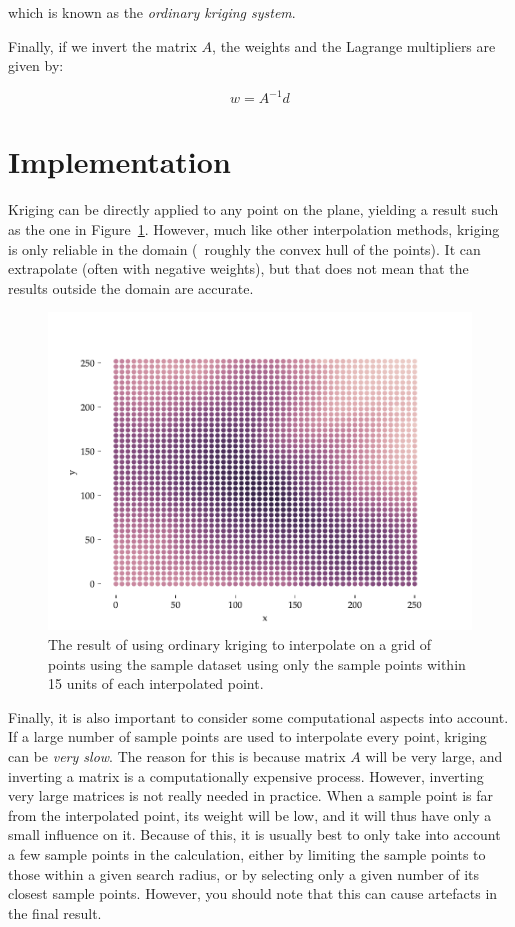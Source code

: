 which is known as the \emph{ordinary kriging system}.

Finally, if we invert the matrix \(A\), the weights and the Lagrange multipliers are given by:

\begin{equation}
w = A^{-1}d
\end{equation}

%
\section{Implementation}

Kriging can be directly applied to any point on the plane, yielding a result such as the one in Figure~\ref{fig:interpolation}.
However, much like other interpolation methods, kriging is only reliable in the domain (\ie\ roughly the convex hull of the points).
It can extrapolate (often with negative weights), but that does not mean that the results outside the domain are accurate.

\begin{figure}[htbp]
\centering
\includegraphics[width=\linewidth]{figs/interpolation}
\caption{The result of using ordinary kriging to interpolate on a grid of points using the sample dataset using only the sample points within 15 units of each interpolated point.}%
\label{fig:interpolation}
\end{figure}

Finally, it is also important to consider some computational aspects into account.
If a large number of sample points are used to interpolate every point, kriging can be \emph{very slow}.
The reason for this is because matrix \(A\) will be very large, and inverting a matrix is a computationally expensive process.
However, inverting very large matrices is not really needed in practice.
When a sample point is far from the interpolated point, its weight will be low, and it will thus have only a small influence on it.
Because of this, it is usually best to only take into account a few sample points in the calculation, either by limiting the sample points to those within a given search radius, or by selecting only a given number of its closest sample points.
However, you should note that this can cause artefacts in the final result.

